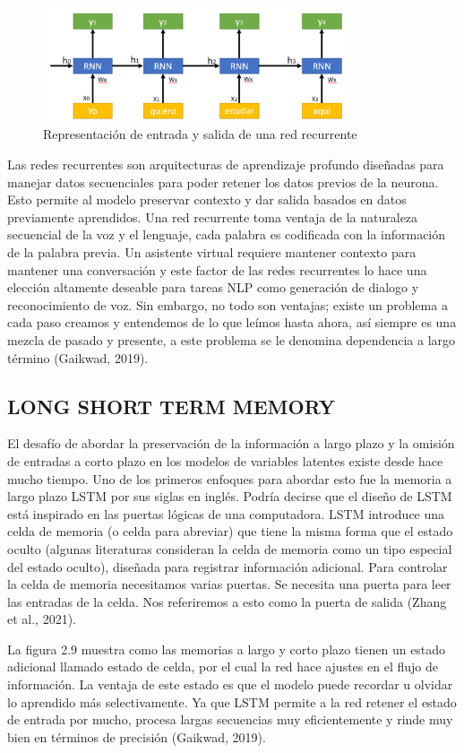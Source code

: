 \documentclass[letter, openright, 12pt]{book}
\begin{document}
\begin{figure}[H]
\includegraphics[width=0.8\textwidth]{figura2_8}
\caption{Representación de entrada y salida de una red recurrente }
\label{tab:figura2_8} 
\end{figure}

Las redes recurrentes son arquitecturas de aprendizaje profundo diseñadas para manejar datos secuenciales para poder retener los datos previos de la neurona. Esto permite al modelo preservar contexto y dar salida basados en datos previamente aprendidos. Una red recurrente toma ventaja de la naturaleza secuencial de la voz y el lenguaje, cada palabra es codificada con la información de la palabra previa. Un asistente virtual requiere mantener contexto para mantener una conversación y este factor de las redes recurrentes lo hace una elección altamente deseable para tareas NLP como generación de dialogo y reconocimiento de voz. Sin embargo, no todo son ventajas; existe un problema a cada paso creamos y entendemos de lo que leímos hasta ahora, así siempre es una mezcla de pasado y presente, a este problema se le denomina dependencia a largo término (Gaikwad, 2019).

\subsection{LONG SHORT TERM MEMORY}
El desafío de abordar la preservación de la información a largo plazo y la omisión de entradas a corto plazo en los modelos de variables latentes existe desde hace mucho tiempo. Uno de los primeros enfoques para abordar esto fue la memoria a largo plazo LSTM por sus siglas en inglés. Podría decirse que el diseño de LSTM está inspirado en las puertas lógicas de una computadora. LSTM introduce una celda de memoria (o celda para abreviar) que tiene la misma forma que el estado oculto (algunas literaturas consideran la celda de memoria como un tipo especial del estado oculto), diseñada para registrar información adicional. Para controlar la celda de memoria necesitamos varias puertas. Se necesita una puerta para leer las entradas de la celda. Nos referiremos a esto como la puerta de salida (Zhang et al., 2021).
\par
La figura 2.9 muestra como las memorias a largo y corto plazo tienen un estado adicional llamado estado de celda, por el cual la red hace ajustes en el flujo de información. La ventaja de este estado es que el modelo puede recordar u olvidar lo aprendido más selectivamente. Ya que LSTM permite a la red retener el estado de entrada por mucho, procesa largas secuencias muy eficientemente y rinde muy bien en términos de precisión (Gaikwad, 2019).
\end{document}
